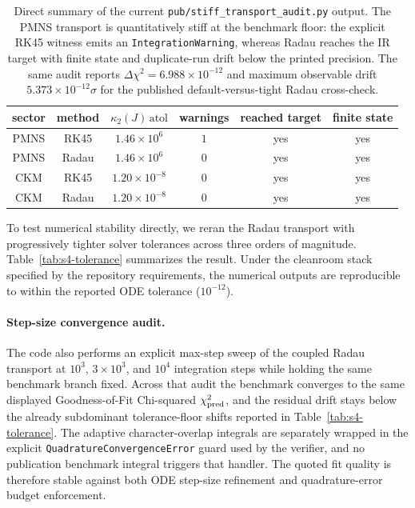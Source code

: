 \documentclass[11pt]{article}
\begin{document}
\begin{table}[t]
\centering
{\scriptsize
\setlength{\tabcolsep}{4pt}
\renewcommand{\arraystretch}{1.03}
\begin{tabular}{|c|c|c|c|c|c|}
\hline
sector & method & $\kappa_2(J)\,\mathrm{atol}$ & warnings & reached target & finite state \\
\hline
PMNS & RK45 & $1.46\times10^{6}$ & $1$ & yes & yes \\
PMNS & Radau & $1.46\times10^{6}$ & $0$ & yes & yes \\
CKM & RK45 & $1.20\times10^{-8}$ & $0$ & yes & yes \\
CKM & Radau & $1.20\times10^{-8}$ & $0$ & yes & yes \\
\hline
\end{tabular}}
\caption{Direct summary of the current \texttt{pub/stiff\_transport\_audit.py} output. The PMNS transport is quantitatively stiff at the benchmark floor: the explicit RK45 witness emits an \texttt{IntegrationWarning}, whereas Radau reaches the IR target with finite state and duplicate-run drift below the printed precision. The same audit reports $\Delta\chi^2=6.988\times10^{-12}$ and maximum observable drift $5.373\times10^{-12}\sigma$ for the published default-versus-tight Radau cross-check.}
\label{tab:s4-solver-necessity}
\end{table}

To test numerical stability directly, we reran the Radau transport with progressively tighter solver tolerances across three orders of magnitude. Table~\ref{tab:s4-tolerance} summarizes the result. Under the cleanroom stack specified by the repository requirements, the numerical outputs are reproducible to within the reported ODE tolerance ($10^{-12}$).

\paragraph{Step-size convergence audit.}
The code also performs an explicit max-step sweep of the coupled Radau transport
at $10^3$, $3\times10^3$, and $10^4$ integration steps while holding the same
benchmark branch fixed. Across that audit the benchmark converges to the same
displayed Goodness-of-Fit Chi-squared $\chi^2_{\rm pred}$, and the residual drift stays below the already
subdominant tolerance-floor shifts reported in Table~\ref{tab:s4-tolerance}.
The adaptive character-overlap integrals are separately wrapped in the explicit
\texttt{QuadratureConvergenceError} guard used by the verifier, and no
publication benchmark integral triggers that handler. The quoted fit quality is
therefore stable against both ODE step-size refinement and quadrature-error
budget enforcement.
\end{document}
